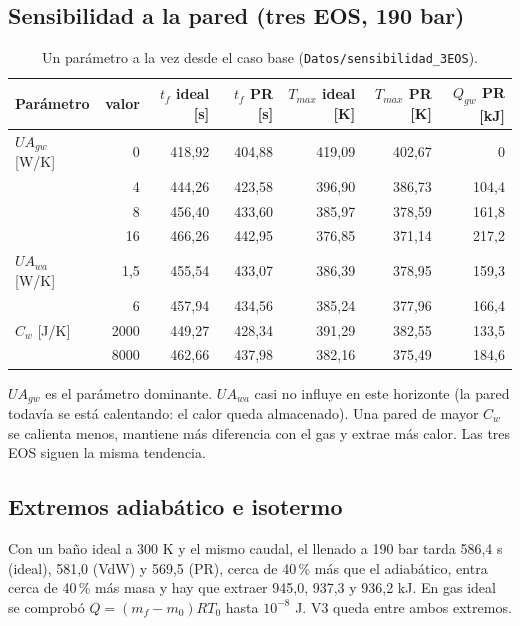 \documentclass[11pt]{article}
\begin{document}
\subsection{Sensibilidad a la pared (tres EOS, 190 bar)}
\begin{table}[h]\centering\small
\begin{tabular}{lrrrrrr}\toprule
Parámetro & valor & $t_f$ ideal [s] & $t_f$ PR [s] & $T_{max}$ ideal [K] & $T_{max}$ PR [K] & $Q_{gw}$ PR [kJ]\\\midrule
$UA_{gw}$ [W/K] & 0 & 418,92 & 404,88 & 419,09 & 402,67 & 0\\
 & 4 & 444,26 & 423,58 & 396,90 & 386,73 & 104,4\\
 & 8 & 456,40 & 433,60 & 385,97 & 378,59 & 161,8\\
 & 16 & 466,26 & 442,95 & 376,85 & 371,14 & 217,2\\
$UA_{wa}$ [W/K] & 1,5 & 455,54 & 433,07 & 386,39 & 378,95 & 159,3\\
 & 6 & 457,94 & 434,56 & 385,24 & 377,96 & 166,4\\
$C_w$ [J/K] & 2000 & 449,27 & 428,34 & 391,29 & 382,55 & 133,5\\
 & 8000 & 462,66 & 437,98 & 382,16 & 375,49 & 184,6\\\bottomrule
\end{tabular}
\caption{Un parámetro a la vez desde el caso base (\texttt{Datos/sensibilidad\_3EOS}).}
\end{table}
$UA_{gw}$ es el parámetro dominante. $UA_{wa}$ casi no influye en este horizonte (la pared todavía se está calentando:
el calor queda almacenado). Una pared de mayor $C_w$ se calienta menos, mantiene más diferencia con el gas y extrae más calor.
Las tres EOS siguen la misma tendencia.

\subsection{Extremos adiabático e isotermo}
Con un baño ideal a 300 K y el mismo caudal, el llenado a 190 bar tarda 586,4 s (ideal), 581,0 (VdW) y 569,5 (PR),
cerca de 40\,\% más que el adiabático, entra cerca de 40\,\% más masa y hay que extraer 945,0, 937,3 y 936,2 kJ.
En gas ideal se comprobó $Q=(m_f-m_0)RT_0$ hasta $10^{-8}$ J. V3 queda entre ambos extremos.
\end{document}
